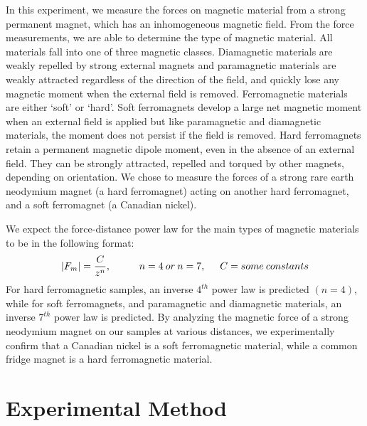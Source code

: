 \documentclass[letterpaper]{article}
\begin{document}
In this experiment, we measure the forces on magnetic material from a strong permanent magnet,
which has an inhomogeneous magnetic field. From the force measurements, we are able to determine the type
of magnetic material. All materials fall into one of three magnetic classes.
Diamagnetic materials are weakly repelled by strong external magnets and paramagnetic materials are weakly attracted
regardless of the direction of the field, and quickly lose any magnetic moment when the external field is removed. Ferromagnetic materials are either `soft' or `hard'. Soft ferromagnets develop
a large net magnetic moment when an external field is applied but like paramagnetic and diamagnetic materials, the moment does not persist if the field is removed.
Hard ferromagnets retain a permanent magnetic dipole moment, even in the absence of an external field. They can be
strongly attracted, repelled and torqued by other magnets, depending on orientation.
We chose to measure the forces of a strong rare earth neodymium magnet (a hard ferromagnet) acting on
another hard ferromagnet, and a soft ferromagnet (a Canadian nickel).

We expect the force-distance power law for the main types of magnetic materials to be in the following format:
$$|F_m|=\frac{C}{z^n}, \hspace{1cm}n=4 \:or\: n=7,\hspace{0.5cm} C=some\:constants$$
For hard ferromagnetic samples, an inverse $4^{th}$ power law is predicted $(n=4)$, while for soft ferromagnets, and paramagnetic and diamagnetic materials,
an inverse $7^{th}$ power law is predicted. By analyzing the magnetic force of a strong neodymium magnet on our
samples at various distances, we experimentally confirm that a Canadian nickel is a soft ferromagnetic material, while
a common fridge magnet is a hard ferromagnetic material.

\section{Experimental Method}
\end{document}
